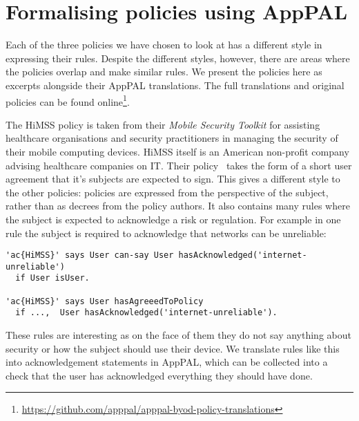 \documentclass[a4paper]{article}
\begin{document}
\section{Formalising policies using AppPAL}
\label{sec:idea}

Each of the three policies we have chosen to look at has a different style in expressing their rules.
Despite the different styles, however, there are areas where the policies overlap and make similar rules.
We present the policies here as excerpts alongside their AppPAL translations.
The full translations and original policies can be found online\footnote{\url{https://github.com/apppal/apppal-byod-policy-translations}}.

The \ac{HiMSS} policy is taken from their \emph{Mobile Security Toolkit} for assisting healthcare organisations and security practitioners in managing the security of their mobile computing devices. 
\ac{HiMSS} itself is an American non-profit company advising healthcare companies on IT.
Their policy~\cite{healthcare_information_and_management_systems_society_mobile_2012} takes the form of a short user agreement that it's subjects are expected to sign.  
This gives a different style to the other policies: policies are expressed from the perspective of the subject, rather than as decrees from the policy authors.
It also contains many rules where the subject is expected to acknowledge a risk or regulation.  
For example in one rule the subject is required to acknowledge that networks can be unreliable:
\begin{lstlisting}[title={\footnotesize\textbf{\ac{HiMSS}}:~\itshape 
I understand and accept that synchronisation relies on one or more cellular network providers and the Internet, and that both are subject to slowdowns and outages of extended duration that are beyond the control of IT.}]
'ac{HiMSS}' says User can-say User hasAcknowledged('internet-unreliable')
  if User isUser.

'ac{HiMSS}' says User hasAgreeedToPolicy
  if ...,  User hasAcknowledged('internet-unreliable').
\end{lstlisting}
These rules are interesting as on the face of them they do not say anything about security or how the subject should use their device.
We translate rules like this into acknowledgement statements in AppPAL, which can be collected into a check that the user has acknowledged everything they should have done.
\end{document}
